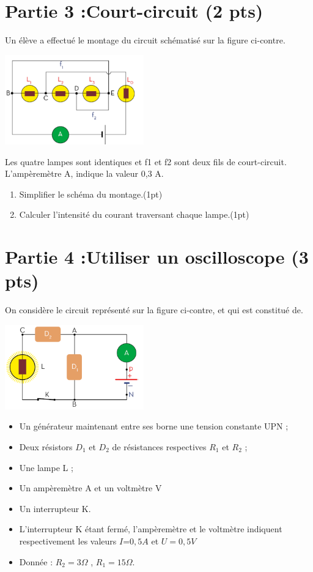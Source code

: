 \documentclass[12pt]{article}
\begin{document}
 \section*{Partie 3 :Court-circuit \dotfill(2 pts)}
Un élève a effectué le montage du circuit schématisé sur la
figure ci-contre.
	\begin{center}
	\includegraphics[width=0.45\textwidth]{./img/ex03.png}
\end{center}
Les quatre lampes sont identiques et f1 et f2 sont deux fils de
court-circuit.
L'ampèremètre A, indique la valeur 0,3 A.
\begin{enumerate}

\item Simplifier le schéma du montage.\dotfill(1pt)
\item  Calculer l'intensité du courant traversant chaque lampe.\dotfill(1pt)
\end{enumerate}
 \section*{Partie 4 :Utiliser un oscilloscope  \dotfill(3 pts)}
On considère le circuit représenté sur la figure ci-contre, et
qui est constitué de.
	\begin{center}
	\includegraphics[width=0.45\textwidth]{./img/ex04.png}
\end{center}
\begin{itemize}
	\item  Un générateur maintenant entre ses borne une tension
constante UPN ;
\item Deux résistors $D_1$ et $D_2$ de résistances respectives $R_1$ et $R_2$ ;

\item Une lampe L ;
\item Un ampèremètre A et un voltmètre V
\item Un interrupteur K.
\item  L’interrupteur K étant fermé, l’ampèremètre et le voltmètre indiquent respectivement les valeurs $I$=$0,5 A$ et $U = 0,5 V $
\item Donnée : $R_2 = 3\Omega$ , $R_1 =15 \Omega$.
\end{itemize}
\end{document}
